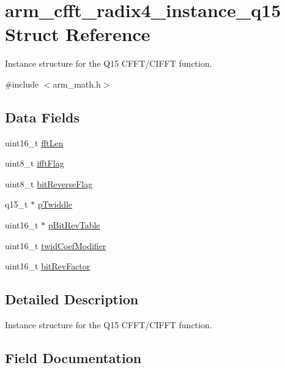 \hypertarget{structarm__cfft__radix4__instance__q15}{}\section{arm\+\_\+cfft\+\_\+radix4\+\_\+instance\+\_\+q15 Struct Reference}
\label{structarm__cfft__radix4__instance__q15}


Instance structure for the Q15 C\+F\+F\+T/\+C\+I\+F\+FT function.  




{\ttfamily \#include $<$arm\+\_\+math.\+h$>$}

\subsection*{Data Fields}
\begin{DoxyCompactItemize}
\item 
uint16\+\_\+t \mbox{\hyperlink{structarm__cfft__radix4__instance__q15_ab8db3bbe7c61e6bb8ca2a55e3446e11a}{fft\+Len}}
\item 
uint8\+\_\+t \mbox{\hyperlink{structarm__cfft__radix4__instance__q15_ad6ca6e223f986ebfd94c5ee1e410aa73}{ifft\+Flag}}
\item 
uint8\+\_\+t \mbox{\hyperlink{structarm__cfft__radix4__instance__q15_a09a221a818c6d0e064557a99e2fe9a8b}{bit\+Reverse\+Flag}}
\item 
q15\+\_\+t $\ast$ \mbox{\hyperlink{structarm__cfft__radix4__instance__q15_aa8c837c05b2c910342ab8f171d30dc02}{p\+Twiddle}}
\item 
uint16\+\_\+t $\ast$ \mbox{\hyperlink{structarm__cfft__radix4__instance__q15_a46a2fb328199897af100fea0bfdf59aa}{p\+Bit\+Rev\+Table}}
\item 
uint16\+\_\+t \mbox{\hyperlink{structarm__cfft__radix4__instance__q15_afe772e5b5001c9d8e85032115a8df5bf}{twid\+Coef\+Modifier}}
\item 
uint16\+\_\+t \mbox{\hyperlink{structarm__cfft__radix4__instance__q15_a33386d95319dc3ee7097b3a8e52e01ec}{bit\+Rev\+Factor}}
\end{DoxyCompactItemize}


\subsection{Detailed Description}
Instance structure for the Q15 C\+F\+F\+T/\+C\+I\+F\+FT function. 

\subsection{Field Documentation}
\mbox{\label{structarm__cfft__radix4__instance__q15_a09a221a818c6d0e064557a99e2fe9a8b}} 
